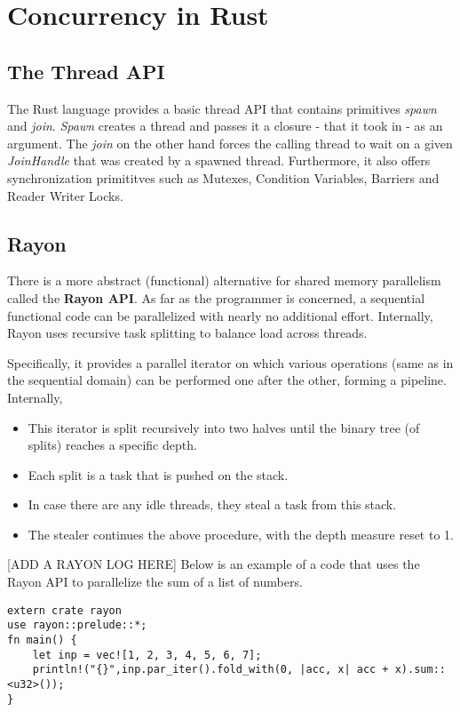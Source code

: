 
\chapter{Concurrency in Rust} %

\label{Chapter2} %



\section{The Thread API}
The Rust language provides a basic thread API that contains primitives \emph{spawn} and \emph{join}. \emph{Spawn} creates a thread and passes it a closure - that it took in - as an argument. The \emph{join} on the other hand forces the calling thread to wait on a given \emph{JoinHandle} that was created by a spawned thread. Furthermore, it also offers synchronization primititves such as Mutexes, Condition Variables, Barriers and Reader Writer Locks.

\section{Rayon}

There is a more abstract (functional) alternative for shared memory parallelism called the \textbf{Rayon API}. As far as the programmer is concerned, a sequential functional code can be parallelized with nearly no additional effort. Internally, Rayon uses recursive task splitting to balance load across threads.

Specifically, it provides a parallel iterator on which various operations (same as in the sequential domain) can be performed one after the other, forming a pipeline. Internally,
\begin{itemize}
    \item This iterator is split recursively into two halves until the binary tree (of splits) reaches a specific depth.
    \item Each split is a task that is pushed on the stack.
    \item In case there are any idle threads, they steal a task from this stack.
    \item The stealer continues the above procedure, with the depth measure reset to 1.
\end{itemize}
[ADD A RAYON LOG HERE]
Below is an example of a code that uses the Rayon API to parallelize the sum of a list of numbers.
\begin{verbatim}
extern crate rayon
use rayon::prelude::*;
fn main() {
    let inp = vec![1, 2, 3, 4, 5, 6, 7];
    println!("{}",inp.par_iter().fold_with(0, |acc, x| acc + x).sum::<u32>());
}
\end{verbatim}
